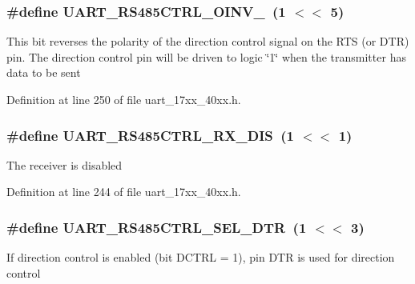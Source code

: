 \subsubsection[{\texorpdfstring{U\+A\+R\+T\+\_\+\+R\+S485\+C\+T\+R\+L\+\_\+\+O\+I\+N\+V\+\_\+1}{UART_RS485CTRL_OINV_1}}]{\setlength{\rightskip}{0pt plus 5cm}\#define U\+A\+R\+T\+\_\+\+R\+S485\+C\+T\+R\+L\+\_\+\+O\+I\+N\+V\+\_~(1 $<$$<$ 5)}\hypertarget{group__UART__17XX__40XX_gaadf3ec8419a76ba6c3ccd2a4eb9b233b}{}\label{group__UART__17XX__40XX_gaadf3ec8419a76ba6c3ccd2a4eb9b233b}
This bit reverses the polarity of the direction control signal on the R\+TS (or D\+TR) pin. The direction control pin will be driven to logic \char`\"{}1\char`\"{} when the transmitter has data to be sent 

Definition at line 250 of file uart\+\_\+17xx\+\_\+40xx.\+h.

\subsubsection[{\texorpdfstring{U\+A\+R\+T\+\_\+\+R\+S485\+C\+T\+R\+L\+\_\+\+R\+X\+\_\+\+D\+IS}{UART_RS485CTRL_RX_DIS}}]{\setlength{\rightskip}{0pt plus 5cm}\#define U\+A\+R\+T\+\_\+\+R\+S485\+C\+T\+R\+L\+\_\+\+R\+X\+\_\+\+D\+IS~(1 $<$$<$ 1)}\hypertarget{group__UART__17XX__40XX_gacdaee14296a914ca14d877069414f88f}{}\label{group__UART__17XX__40XX_gacdaee14296a914ca14d877069414f88f}
The receiver is disabled 

Definition at line 244 of file uart\+\_\+17xx\+\_\+40xx.\+h.

\subsubsection[{\texorpdfstring{U\+A\+R\+T\+\_\+\+R\+S485\+C\+T\+R\+L\+\_\+\+S\+E\+L\+\_\+\+D\+TR}{UART_RS485CTRL_SEL_DTR}}]{\setlength{\rightskip}{0pt plus 5cm}\#define U\+A\+R\+T\+\_\+\+R\+S485\+C\+T\+R\+L\+\_\+\+S\+E\+L\+\_\+\+D\+TR~(1 $<$$<$ 3)}\hypertarget{group__UART__17XX__40XX_ga0632053088b7e65c6000274a90a76091}{}\label{group__UART__17XX__40XX_ga0632053088b7e65c6000274a90a76091}
If direction control is enabled (bit D\+C\+T\+RL = 1), pin D\+TR is used for direction control 

